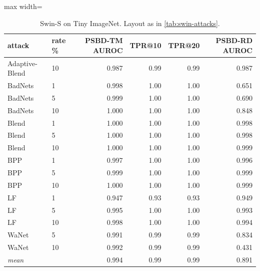 \begin{table}[htbp]
\centering
\small
\caption{Swin-S on Tiny ImageNet. Layout as in \cref{tab:swin-attacks}.}
\label{tab:swin-attacks-tiny-imagenet}
\begin{adjustbox}{max width=\linewidth}
\begin{tabular}{llrrrr}
\toprule
attack & rate \% & PSBD-TM AUROC & TPR@10 & TPR@20 & PSBD-RD AUROC \\
\midrule
Adaptive-Blend & 10 & 0.987 & 0.99 & 0.99 & 0.987 \\
BadNets & 1 & 0.998 & 1.00 & 1.00 & 0.651 \\
BadNets & 5 & 0.999 & 1.00 & 1.00 & 0.690 \\
BadNets & 10 & 1.000 & 1.00 & 1.00 & 0.848 \\
Blend & 1 & 1.000 & 1.00 & 1.00 & 0.998 \\
Blend & 5 & 1.000 & 1.00 & 1.00 & 0.998 \\
Blend & 10 & 1.000 & 1.00 & 1.00 & 0.999 \\
BPP & 1 & 0.997 & 1.00 & 1.00 & 0.996 \\
BPP & 5 & 0.999 & 1.00 & 1.00 & 0.999 \\
BPP & 10 & 1.000 & 1.00 & 1.00 & 0.999 \\
LF & 1 & 0.947 & 0.93 & 0.93 & 0.949 \\
LF & 5 & 0.995 & 1.00 & 1.00 & 0.993 \\
LF & 10 & 0.998 & 1.00 & 1.00 & 0.994 \\
WaNet & 5 & 0.991 & 0.99 & 0.99 & 0.834 \\
WaNet & 10 & 0.992 & 0.99 & 0.99 & 0.431 \\
\rowcolor{black!8}\emph{mean} &  & 0.994 & 0.99 & 0.99 & 0.891 \\
\bottomrule
\end{tabular}
\end{adjustbox}
\end{table}
